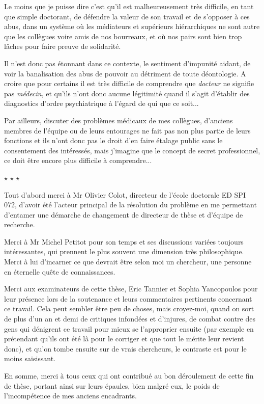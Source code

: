 \documentclass[11pt,final,twoside,nofrench]{thlifl}
\newcommand{\starline}{
  \bigskip \bigskip \bigskip
  \centerline{$\star$ \quad \quad \quad $\star$ \quad \quad \quad $\star$}
  \bigskip \bigskip \bigskip}
\begin{document}
Le moins que je puisse dire c'est qu'il est malheureusement très difficile, en tant que simple doctorant, de défendre la valeur de son travail et de s'opposer à ces abus, dans un système où les médiateurs et supérieurs hiérarchiques ne sont autre que les collègues voire amis de nos bourreaux, et où nos pairs sont bien trop lâches pour faire preuve de solidarité.

Il n'est donc pas étonnant dans ce contexte, le sentiment d'impunité aidant, de voir la banalisation des abus de pouvoir au détriment de toute déontologie. A croire que pour certains il est très difficile de comprendre que \textit{docteur} ne signifie pas \textit{médecin}, et qu'ils n'ont donc aucune légitimité quand il s'agit d'établir des diagnostics d'ordre psychiatrique à l'égard de qui que ce soit...

Par ailleurs, discuter des problèmes médicaux de mes collègues, d'anciens membres de l'équipe ou de leurs entourages ne fait pas non plus partie de leurs fonctions et ils n'ont donc pas le droit d'en faire étalage public sans le consentement des intéressés, mais j'imagine que le concept de secret professionnel, ce doit être encore plus difficile à comprendre...

\starline

Tout d'abord merci à Mr Olivier Colot, directeur de l'école doctorale ED SPI 072, d'avoir été l'acteur principal de la résolution du problème en me permettant d'entamer une démarche de changement de directeur de thèse et d'équipe de recherche.

Merci à Mr Michel Petitot pour son temps et ses discussions variées toujours intéressantes, qui prennent le plus souvent une dimension très philosophique. Merci à lui d'incarner ce que devrait être selon moi un chercheur, une personne en éternelle quête de connaissances.

Merci aux examinateurs de cette thèse, Eric Tannier et Sophia Yancopoulos pour leur présence lors de la soutenance et leurs commentaires pertinents concernant ce travail. Cela peut sembler être peu de choses, mais croyez-moi, quand on sort de plus d'un an et demi de critiques infondées et d'injures, de combat contre des gens qui dénigrent ce travail pour mieux se l'approprier ensuite (par exemple en prétendant qu'ils ont été là pour le corriger et que tout le mérite leur revient donc), et qu'on tombe ensuite sur de vrais chercheurs, le contraste est pour le moins saisissant.

En somme, merci à tous ceux qui ont contribué au bon déroulement de cette fin de thèse, portant ainsi sur leurs épaules, bien malgré eux, le poids de l'incompétence de mes anciens encadrants.
\end{document}
